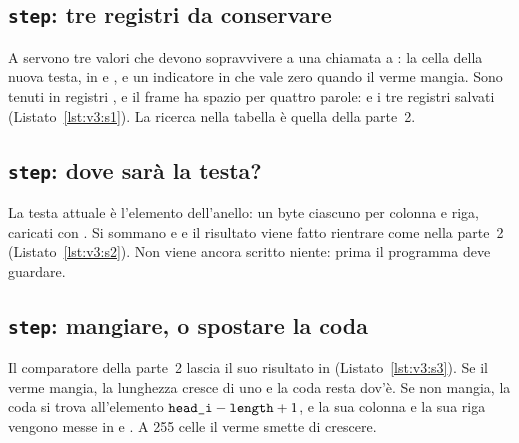 

\subsection{\texttt{step}: tre registri da conservare}


A  servono tre valori che devono sopravvivere a una chiamata a
: la cella della nuova testa, in  e , e un
indicatore in  che vale zero quando il verme mangia. Sono tenuti in
registri , e il frame ha spazio per quattro parole:  e i tre
registri salvati (Listato~\ref{lst:v3:s1}). La ricerca nella tabella è quella
della parte~2.

\subsection{\texttt{step}: dove sarà la testa?}


La testa attuale è l'elemento  dell'anello: un byte ciascuno per
colonna e riga, caricati con . Si sommano  e  e il
risultato viene fatto rientrare come nella parte~2
(Listato~\ref{lst:v3:s2}). Non viene ancora scritto niente: prima il programma
deve guardare.

\subsection{\texttt{step}: mangiare, o spostare la coda}


Il comparatore della parte~2 lascia il suo risultato in 
(Listato~\ref{lst:v3:s3}). Se il verme mangia, la lunghezza cresce di uno e la
coda resta dov'è. Se non mangia, la coda si trova all'elemento
$\texttt{head\_i}-\texttt{length}+1$, e la sua colonna e la sua riga vengono messe
in  e . A 255 celle il verme smette di crescere.

